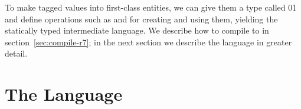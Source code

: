 \documentclass[7x10]{TimesAPriori_MIT}%
\def\racketEd{0}
\def\pythonEd{1}
\providecommand{\BookEdition}{1}
\let\edition\BookEdition
\newcommand{\racket}[1]{{\if\edition\racketEd{#1}\fi}}
\newcommand{\pythonColor}[0]{}
\newcommand{\python}[1]{{\if\edition\pythonEd\pythonColor #1\fi}}
\numberwithin{theorem}{chapter}
\numberwithin{definition}{chapter}
\numberwithin{equation}{chapter}
\begin{document}
To make tagged values into first-class entities, we can give them a
type called \racket{}\python{} and define
operations such as  and  for creating and
using them, yielding the statically typed \LangAny{} intermediate
language. We describe how to compile \LangDyn{} to \LangAny{} in
section~\ref{sec:compile-r7}; in the next section we describe the
\LangAny{} language in greater detail.

\section{The \LangAny{} Language}
\label{sec:Rany-lang}

\newcommand{\LanyASTRacket}{
\begin{array}{lcl}
\Type &::= & \ANYTY \\
\FType &::=& \key{Integer} \MID \key{Boolean} \MID \key{Void} 
      \MID \LP\key{Vector}\; \ANYTY\ldots\RP 
      \MID \LP\ANYTY\ldots \; \key{->}\; \ANYTY\RP\\
\itm{op} &::= & \code{any-vector-length}
     \MID \code{any-vector-ref} \MID \code{any-vector-set!}\\
    &\MID& \code{boolean?} \MID \code{integer?} \MID \code{vector?}
     \MID \code{procedure?} \MID \code{void?} \\
  \Exp &::=& \INJECT{\Exp}{\FType} \MID \PROJECT{\Exp}{\FType} 
\end{array}
}

\newcommand{\LanyASTPython}{
\begin{array}{lcl}
\Type &::= & \key{AnyType()} \\
\FType &::=& \key{IntType()} \MID \key{BoolType()} \MID \key{VoidType()}
  \MID \key{TupleType}\LS\key{AnyType()}^+\RS \\
  &\MID& \key{FunctionType}\LP \key{AnyType()}^{*}\key{, }\key{AnyType()}\RP \\
\Exp & ::= & \INJECT{\Exp}{\FType} \MID \PROJECT{\Exp}{\FType} \\
     &\MID& \CALL{\VAR{\skey{any\_tuple\_load}}}{\LS\Exp\key{, }\Exp\RS}\\
     &\MID& \CALL{\VAR{\skey{any\_len}}}{\LS\Exp\RS} \\
     &\MID& \CALL{\VAR{\skey{arity}}}{\LS\Exp\RS}  \\
     &\MID& \CALL{\VAR{\skey{make\_any}}}{\LS\Exp\key{, }\INT{\Int}\RS} 
\end{array}
}
\end{document}

